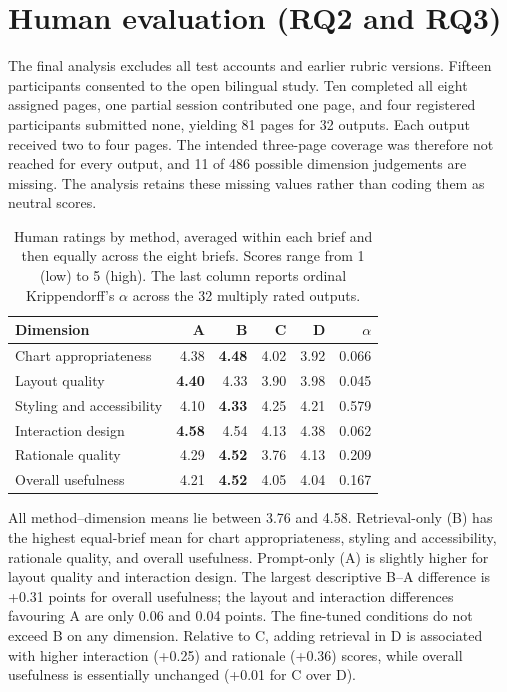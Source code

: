\section{Human evaluation (RQ2 and RQ3)}

The final analysis excludes all test accounts and earlier rubric versions. Fifteen participants consented to the open bilingual study. Ten completed all eight assigned pages, one partial session contributed one page, and four registered participants submitted none, yielding 81 pages for 32 outputs. Each output received two to four pages. The intended three-page coverage was therefore not reached for every output, and 11 of 486 possible dimension judgements are missing. The analysis retains these missing values rather than coding them as neutral scores.

\begin{table}[htbp]
\centering
\small
\setlength{\tabcolsep}{4.2pt}
\caption{Human ratings by method, averaged within each brief and then equally across the eight briefs. Scores range from 1 (low) to 5 (high). The last column reports ordinal Krippendorff's $\alpha$ across the 32 multiply rated outputs.}
\label{tab:human-evaluation-results}
\begin{tabular}{lrrrrr}
\toprule
Dimension & A & B & C & D & $\alpha$ \\
\midrule
Chart appropriateness & 4.38 & \textbf{4.48} & 4.02 & 3.92 & 0.066 \\
Layout quality & \textbf{4.40} & 4.33 & 3.90 & 3.98 & 0.045 \\
Styling and accessibility & 4.10 & \textbf{4.33} & 4.25 & 4.21 & 0.579 \\
Interaction design & \textbf{4.58} & 4.54 & 4.13 & 4.38 & 0.062 \\
Rationale quality & 4.29 & \textbf{4.52} & 3.76 & 4.13 & 0.209 \\
Overall usefulness & 4.21 & \textbf{4.52} & 4.05 & 4.04 & 0.167 \\
\bottomrule
\end{tabular}
\end{table}

All method--dimension means lie between 3.76 and 4.58. Retrieval-only (B) has the highest equal-brief mean for chart appropriateness, styling and accessibility, rationale quality, and overall usefulness. Prompt-only (A) is slightly higher for layout quality and interaction design. The largest descriptive B--A difference is +0.31 points for overall usefulness; the layout and interaction differences favouring A are only 0.06 and 0.04 points. The fine-tuned conditions do not exceed B on any dimension. Relative to C, adding retrieval in D is associated with higher interaction (+0.25) and rationale (+0.36) scores, while overall usefulness is essentially unchanged (+0.01 for C over D).

